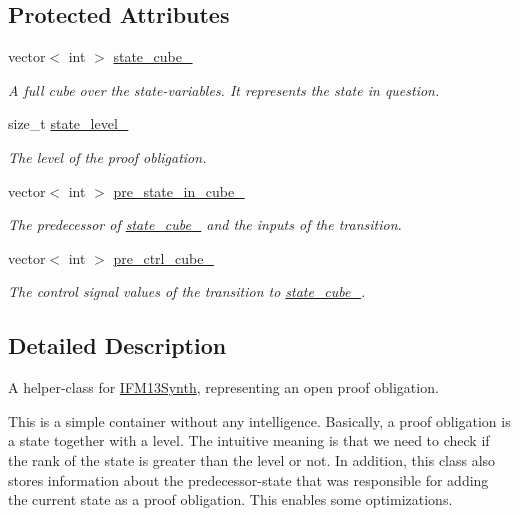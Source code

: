\subsection*{Protected Attributes}
\begin{DoxyCompactItemize}
\item 
vector$<$ int $>$ \hyperlink{classIFMProofObligation_a688b714ebad4010c14e11355a73faf3c}{state\-\_\-cube\-\_\-}
\begin{DoxyCompactList}\small\item\em A full cube over the state-\/variables. It represents the state in question. \end{DoxyCompactList}\item 
size\-\_\-t \hyperlink{classIFMProofObligation_a6207c16b84a41450a8ca31ed8a35b4ea}{state\-\_\-level\-\_\-}
\begin{DoxyCompactList}\small\item\em The level of the proof obligation. \end{DoxyCompactList}\item 
vector$<$ int $>$ \hyperlink{classIFMProofObligation_a949c4d45bd6986a2349edc8f39f38e3f}{pre\-\_\-state\-\_\-in\-\_\-cube\-\_\-}
\begin{DoxyCompactList}\small\item\em The predecessor of \hyperlink{classIFMProofObligation_a688b714ebad4010c14e11355a73faf3c}{state\-\_\-cube\-\_\-} and the inputs of the transition. \end{DoxyCompactList}\item 
vector$<$ int $>$ \hyperlink{classIFMProofObligation_ac29130636a6423e42daf1616754c6c29}{pre\-\_\-ctrl\-\_\-cube\-\_\-}
\begin{DoxyCompactList}\small\item\em The control signal values of the transition to \hyperlink{classIFMProofObligation_a688b714ebad4010c14e11355a73faf3c}{state\-\_\-cube\-\_\-}. \end{DoxyCompactList}\end{DoxyCompactItemize}


\subsection{Detailed Description}
A helper-\/class for \hyperlink{classIFM13Synth}{I\-F\-M13\-Synth}, representing an open proof obligation. 

This is a simple container without any intelligence. Basically, a proof obligation is a state together with a level. The intuitive meaning is that we need to check if the rank of the state is greater than the level or not. In addition, this class also stores information about the predecessor-\/state that was responsible for adding the current state as a proof obligation. This enables some optimizations.

